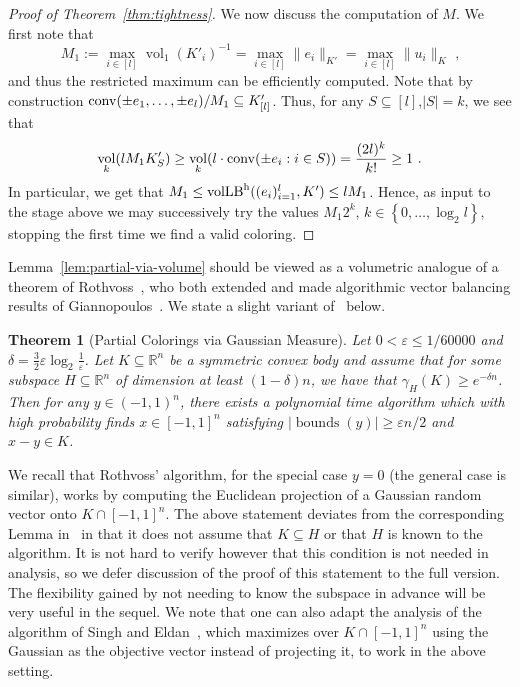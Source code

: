 \documentclass[11pt]{article}
\newtheorem{theorem}{Theorem}
\newcommand{\R}{{\mathbb{R}}}
\newcommand\eps{\varepsilon}
\newcommand{\set}[1]{\left\{ #1 \right\}}
\DeclareMathOperator{\vollb}{volLB}
\DeclareMathOperator{\vol}{vol}
\DeclareMathOperator{\bnds}{bounds}
\newcommand{\notename}[2]{{\textcolor{red}{{\bf (#1:} {#2}{\bf ) }}}}
\newcommand{\notename}[2]{{\textcolor{red}{\footnotesize{\bf (#1:} {#2}{\bf ) }}}}
\newcommand{\dnote}[1]{{\notename{Daniel}{#1}}}
\newcommand{\notename}[2]{{}}
\newcommand{\dnote}[1]{}
\begin{document}
\begin{proof}[Proof of Theorem~\ref{thm:tightness}]
We now discuss the computation of $M$. We first note that 
\[
M_1 := \max_{i \in [l]} \vol_1(K'_i)^{-1} = \max_{i \in [l]} \|e_i\|_{K'} =
\max_{i \in [l]} \|u_i\|_K \text{ ,}
\]
and thus the restricted maximum can be efficiently computed. Note that by
construction ${\rm conv}(\pm e_1,\dots, \pm e_l)/M_1 \subseteq K'_{[l]}$. Thus,
for any $S \subseteq [l]$,$|S|=k$, we see that
\[
\vol_k(l M_1 K'_S) \geq \vol_{k}(l \cdot {\rm conv}(\pm e_i: i \in S)) = \frac{(2l)^k}{k!}
 \geq 1 \text{ .}
\]
In particular, we get that $M_1 \leq \vollb^{\rm h}((e_i)_{i=1}^l,K') \leq l M_1$.
Hence, as input to the stage above we may successively try the values $M_1
2^k$, $k \in \set{0,\dots,\log_2 l}$, stopping the first time we find a valid
coloring. 
\end{proof}

Lemma~\ref{lem:partial-via-volume} should be viewed as a volumetric analogue of
a theorem of Rothvoss~\cite{rothvoss-giann}, who both extended and made
algorithmic vector balancing results of Giannopoulos~\cite{giannop}. We state a
slight variant of~\cite[Lemma 9]{rothvoss-giann} below.


\begin{theorem}[Partial Colorings via Gaussian Measure]\label{thm:roth-giann}
Let $0 < \eps \leq 1/60000$ and $\delta = \frac{3}{2}\eps \log_2
\frac{1}{\eps}$. Let $K \subseteq \R^n$ be a symmetric convex body and assume
that for some subspace $H \subseteq \R^n$ of dimension at least $(1-\delta)n$,
we have that $\gamma_H(K) \geq e^{-\delta n}$. Then for any $y \in (-1,1)^n$,
there exists a polynomial time algorithm which with high probability finds $x
\in [-1,1]^n$ satisfying $|\bnds(y)| \geq \eps n/2$ and $x-y \in K$.
\end{theorem}

We recall that Rothvoss' algorithm, for the special case $y = 0$ (the general
case is similar), works by computing the Euclidean projection of a Gaussian
random vector onto $K \cap [-1,1]^n$. The above statement deviates from the
corresponding Lemma in~\cite{rothvoss-giann} in that it does not assume that $K
\subseteq H$ or that $H$ is known to the algorithm. It is not hard to verify
however that this condition is not needed in analysis, so we defer discussion of
the proof of this statement to the full version. The flexibility gained by not
needing to know the subspace in advance will be very useful in the sequel. We
note that one can also adapt the analysis of the algorithm of Singh and
Eldan~\cite{ES14}, which maximizes over $K \cap [-1,1]^n$ using the Gaussian as
the objective vector instead of projecting it, to work in the above setting.   
\end{document}
